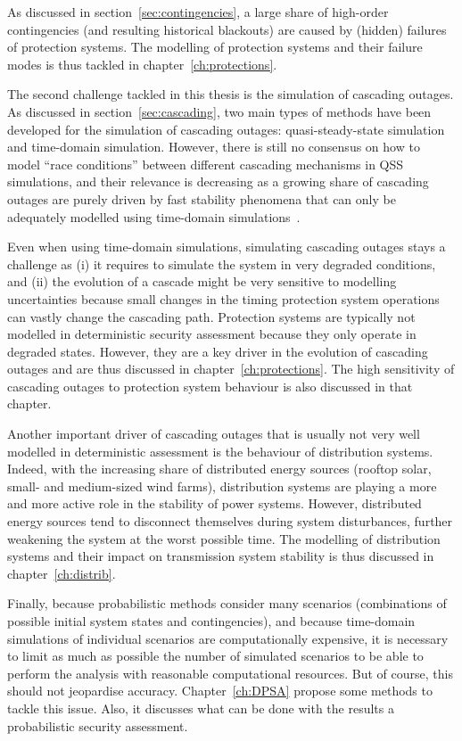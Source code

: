 As discussed in section~\ref{sec:contingencies}, a large share of high-order contingencies (and resulting historical blackouts) are caused by (hidden) failures of protection systems. The modelling of protection systems and their failure modes is thus tackled in chapter~\ref{ch:protections}.

The second challenge tackled in this thesis is the simulation of cascading outages. As discussed in section~\ref{sec:cascading}, two main types of methods have been developed for the simulation of cascading outages: quasi-steady-state simulation and time-domain simulation. However, there is still no consensus on how to model ``race conditions'' between different cascading mechanisms in QSS simulations, and their relevance is decreasing as a growing share of cascading outages are purely driven by fast stability phenomena that can only be adequately modelled using time-domain simulations~\cite{cascadeAcceleration}.

Even when using time-domain simulations, simulating cascading outages stays a challenge as (i) it requires to simulate the system in very degraded conditions, and (ii) the evolution of a cascade might be very sensitive to modelling uncertainties because small changes in the timing protection system operations can vastly change the cascading path. Protection systems are typically not modelled in deterministic security assessment because they only operate in degraded states. However, they are a key driver in the evolution of cascading outages and are thus discussed in chapter~\ref{ch:protections}. The high sensitivity of cascading outages to protection system behaviour is also discussed in that chapter. %

Another important driver of cascading outages that is usually not very well modelled in deterministic assessment is the behaviour of distribution systems. Indeed, with the increasing share of distributed energy sources (rooftop solar, small- and medium-sized wind farms), distribution systems are playing a more and more active role in the stability of power systems. However, distributed energy sources tend to disconnect themselves during system disturbances, further weakening the system at the worst possible time. The modelling of distribution systems and their impact on transmission system stability is thus discussed in chapter~\ref{ch:distrib}.

Finally, because probabilistic methods consider many scenarios (combinations of possible initial system states and contingencies), and because time-domain simulations of individual scenarios are computationally expensive, it is necessary to limit as much as possible the number of simulated scenarios to be able to perform the analysis with reasonable computational resources. But of course, this should not jeopardise accuracy. Chapter~\ref{ch:DPSA} propose some methods to tackle this issue. Also, it discusses what can be done with the results a probabilistic security assessment.
